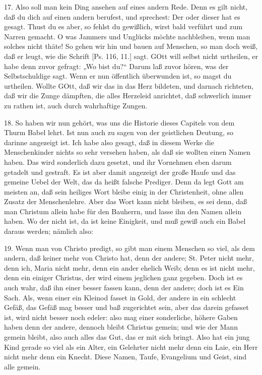 17. Also soll man kein Ding ansehen auf eines andern Rede. Denn es gilt nicht, daß du dich auf einen andern berufest, und sprechest: Der oder dieser hat es gesagt. Thust du es aber, so fehlst du gewißlich, wirst bald verführt und zum Narren gemacht. O was Jammers und Unglücks möchte nachbleiben, wenn man solches nicht thäte! So gehen wir hin und bauen auf Menschen, so man doch weiß, daß er leugt, wie die Schrift [Ps. 116, 11.] sagt. GOtt will selbst nicht urtheilen, er habe denn zuvor gefragt: „Wo bist du?“ Darum laß zuvor hören, was der Selbstschuldige sagt. Wenn er nun öffentlich überwunden ist, so magst du urtheilen. Wollte GOtt, daß wir das in das Herz bildeten, und darnach richteten, daß wir die Zunge dämpften, die alles Herzeleid anrichtet, daß schwerlich immer zu rathen ist, auch durch wahrhaftige Zungen.

18. So haben wir nun gehört, was uns die Historie dieses Capitels von dem Thurm Babel lehrt. Ist nun auch zu sagen von der geistlichen Deutung, so darinne angezeigt ist. Ich habe also gesagt, daß in diesem Werke die Menschenkinder nichts so sehr versehen haben, als daß sie wollten einen Namen haben. Das wird sonderlich dazu gesetzt, und ihr Vornehmen eben darum getadelt und gestraft. Es ist aber damit angezeigt der große Haufe und das gemeine Uebel der Welt, das da heißt falsche Prediger. Denn da legt Gott am meisten an, daß sein heiliges Wort bleibe einig in der Christenheit, ohne allen Zusatz der Menschenlehre. Aber das Wort kann nicht bleiben, es sei denn, daß man Christum allein habe für den Bauherrn, und lasse ihn den Namen allein haben. Wo der nicht ist, da ist keine Einigkeit, und muß gewiß auch ein Babel daraus werden; nämlich also:

19. Wenn man von Christo predigt, so gibt man einem Menschen so viel, als dem andern, daß keiner mehr von Christo hat, denn der andere; St. Peter nicht mehr, denn ich, Maria nicht mehr, denn ein ander ehelich Weib; denn es ist nicht mehr, denn ein einiger Christus, der wird einem jeglichen ganz gegeben. Doch ist es auch wahr, daß ihn einer besser fassen kann, denn der andere; doch ist es Ein Sach. Als, wenn einer ein Kleinod fasset in Gold, der andere in ein schlecht Gefäß, das Gefäß mag besser und baß zugerichtet sein, aber das darein gefasset ist, wird nicht besser noch edeler: also mag einer sonderliche, höhere Gaben haben denn der andere, dennoch bleibt Christus gemein; und wie der Mann gemein bleibt, also auch alles das Gut, das er mit sich bringt. Also hat ein jung Kind gerade so viel als ein Alter, ein Gelehrter nicht mehr denn ein Laie, ein Herr nicht mehr denn ein Knecht. Diese Namen, Taufe, Evangelium und Geist, sind alle gemein.

